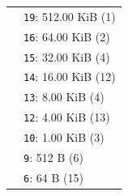 \scriptsize
\setlength{\tabcolsep}{2pt}
\renewcommand{\arraystretch}{1.05}
\begin{tabular}{@{}l l@{}}
\definecolor{c0_255_0}{RGB}{0,255,0}
\colorbox{c0_255_0}{\phantom{Xg}} & \texttt{19}: 512.00 KiB (1) \\
\definecolor{c255_0_0}{RGB}{255,0,0}
\colorbox{c255_0_0}{\phantom{Xg}} & \texttt{16}: 64.00 KiB (2) \\
\definecolor{c215_135_0}{RGB}{215,135,0}
\colorbox{c215_135_0}{\phantom{Xg}} & \texttt{15}: 32.00 KiB (4) \\
\definecolor{c255_95_175}{RGB}{255,95,175}
\colorbox{c255_95_175}{\phantom{Xg}} & \texttt{14}: 16.00 KiB (12) \\
\definecolor{c135_0_255}{RGB}{135,0,255}
\colorbox{c135_0_255}{\phantom{Xg}} & \texttt{13}: 8.00 KiB (4) \\
\definecolor{c0_95_255}{RGB}{0,95,255}
\colorbox{c0_95_255}{\phantom{Xg}} & \texttt{12}: 4.00 KiB (13) \\
\definecolor{c135_255_0}{RGB}{135,255,0}
\colorbox{c135_255_0}{\phantom{Xg}} & \texttt{10}: 1.00 KiB (3) \\
\definecolor{c255_175_0}{RGB}{255,175,0}
\colorbox{c255_175_0}{\phantom{Xg}} & \texttt{9}: 512 B (6) \\
\definecolor{c175_0_255}{RGB}{175,0,255}
\colorbox{c175_0_255}{\phantom{Xg}} & \texttt{6}: 64 B (15) \\
\end{tabular}